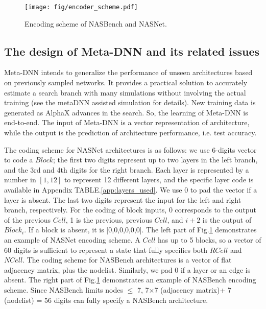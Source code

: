 \documentclass[10pt,twocolumn,letterpaper]{article}
\begin{document}
\begin{figure}
\vspace{-0.2in}
\centering 
\texttt{[image: fig/encoder\_scheme.pdf]}
\caption{Encoding scheme of NASBench and NASNet.}
\label{fig:network-encoding}
\end{figure}

\subsection{The design of Meta-DNN and its related issues}
\label{sec:metadnn}

Meta-DNN intends to generalize the performance of unseen architectures based on previously sampled networks. It provides a practical solution to accurately estimate a search branch with many simulations without involving the actual training (see the metaDNN assisted simulation for details). New training data is generated as AlphaX advances in the search. So, the learning of Meta-DNN is end-to-end. The input of Meta-DNN is a vector representation of architecture, while the output is the prediction of architecture performance, i.e. test accuracy. 

The coding scheme for NASNet architectures is as follows: we use 6-digits vector to code a $Block$; the first two digits represent up to two layers in the left branch, and the 3rd and 4th digits for the right branch. Each layer is represented by a number in $[1, 12]$ to represent 12 different layers, and the specific layer code is available in Appendix TABLE.\ref{app:layers_used}. We use 0 to pad the vector if a layer is absent. The last two digits represent the input for the left and right branch, respectively. For the coding of block inputs, 0 corresponds to the output of the previous $Cell$, 1 is the previous, previous $Cell$, and $i+2$ is the output of $Block_i$. If a block is absent, it is [0,0,0,0,0,0]. The left part of Fig.\ref{fig:network-encoding} demonstrates an example of NASNet encoding scheme. A $Cell$ has up to 5 blocks, so a vector of 60 digits is sufficient to represent a state that fully specifies both $RCell$ and $NCell$. The coding scheme for NASBench architectures is a vector of flat adjacency matrix, plus the nodelist. Similarly, we pad 0 if a layer or an edge is absent. The right part of Fig.\ref{fig:network-encoding} demonstrates an example of NASBench encoding scheme. Since NASBench limits nodes $\leq$ 7, 7$\times$7 (adjacency matrix)+ 7 (nodelist) = 56 digits can fully specify a NASBench architecture.
\end{document}
